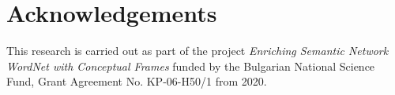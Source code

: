 \documentclass[output=paper,colorlinks,citecolor=brown]{langscibook}
\begin{document}
\section*{Acknowledgements}
\largerpage
This research is carried out as part of the project \emph{Enriching Semantic Network WordNet with Conceptual Frames} funded by the Bulgarian National Science Fund, Grant Agreement No. KP-06-H50/1 from 2020.


{\sloppy\printbibliography[heading=subbibliography,notkeyword=this]}
\end{document}
